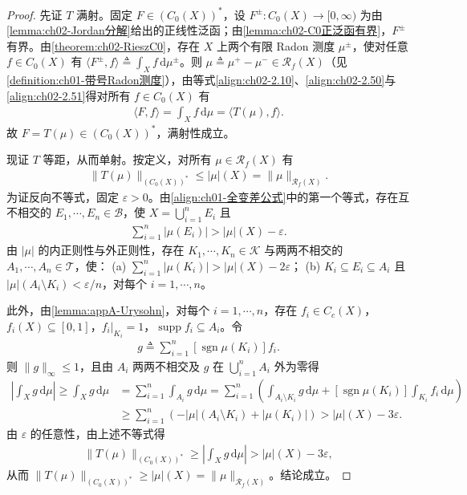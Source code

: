 \documentclass[../../main.tex]{subfiles}%
\begin{document}
\begin{proof}
先证 $T$ 满射。固定 $F\in(C_0(X))^*$，设 $F^\pm:C_0(X)\to[0,\infty)$ 为由\cref{lemma:ch02-Jordan分解}给出的正线性泛函；由\cref{lemma:ch02-C0正泛函有界}，$F^\pm$ 有界。由\cref{theorem:ch02-RieszC0}，存在 $X$ 上两个有限 Radon 测度 $\mu^\pm$，使对任意 $f\in C_0(X)$ 有 $\langle F^\pm,f\rangle\triangleq \int_X f\,\mathrm{d}\mu^\pm$。则 $\mu\triangleq \mu^+-\mu^-\in\mathscr R_f(X)$（见\cref{definition:ch01-带号Radon测度}），由等式\eqref{align:ch02-2.10}、\eqref{align:ch02-2.50}与\eqref{align:ch02-2.51}得对所有 $f\in C_0(X)$ 有
\begin{align*}
\langle F,f\rangle=\int_X f\,\mathrm{d}\mu=\langle T(\mu),f\rangle.
\end{align*}
故 $F=T(\mu)\in(C_0(X))^*$，满射性成立。

现证 $T$ 等距，从而单射。按定义，对所有 $\mu\in\mathscr R_f(X)$ 有
\begin{align*}
\|T(\mu)\|_{(C_0(X))^*}\leqslant|\mu|(X)=\|\mu\|_{\mathscr R_f(X)}.
\end{align*}
为证反向不等式，固定 $\varepsilon>0$。由\eqref{align:ch01-全变差公式}中的第一个等式，存在互不相交的 $E_1,\cdots ,E_n\in\mathscr B$，使 $X=\bigcup_{i=1}^nE_i$ 且
\begin{align*}
\sum_{i=1}^n|\mu(E_i)|>|\mu|(X)-\varepsilon.
\end{align*}
由 $|\mu|$ 的内正则性与外正则性，存在 $K_1,\cdots ,K_n\in\mathscr K$ 与两两不相交的 $A_1,\cdots ,A_n\in\mathscr T$，使：
(a) $\sum_{i=1}^n|\mu(K_i)|>|\mu|(X)-2\varepsilon$；
(b) $K_i\subseteq E_i\subseteq A_i$ 且 $|\mu|(A_i\setminus K_i)<\varepsilon/n$，对每个 $i=1,\cdots ,n$。

此外，由\cref{lemma:appA-Urysohn}，对每个 $i=1,\cdots ,n$，存在 $f_i\in C_c(X)$，$f_i(X)\subseteq[0,1]$，$f_i|_{K_i}=1$，$\operatorname{supp}f_i\subseteq A_i$。令
\begin{align*}
g\triangleq \sum_{i=1}^n[\operatorname{sgn}\mu(K_i)]f_i.
\end{align*}
则 $\|g\|_\infty\leqslant1$，且由 $A_i$ 两两不相交及 $g$ 在 $\bigcup_{i=1}^nA_i$ 外为零得
\begin{align*}
\left|\int_X g\,\mathrm{d}\mu\right|\geqslant\int_X g\,\mathrm{d}\mu
&=\sum_{i=1}^n\int_{A_i}g\,\mathrm{d}\mu
=\sum_{i=1}^n\left(\int_{A_i\setminus K_i}g\,\mathrm{d}\mu+[\operatorname{sgn}\mu(K_i)]\int_{K_i}f_i\,\mathrm{d}\mu\right)\\
&\geqslant\sum_{i=1}^n\left(-|\mu|(A_i\setminus K_i)+|\mu(K_i)|\right)>|\mu|(X)-3\varepsilon.
\end{align*}
由 $\varepsilon$ 的任意性，由上述不等式得
\begin{align*}
\|T(\mu)\|_{(C_0(X))^*}\geqslant\left|\int_X g\,\mathrm{d}\mu\right|>|\mu|(X)-3\varepsilon,
\end{align*}
从而 $\|T(\mu)\|_{(C_0(X))^*}\geqslant|\mu|(X)=\|\mu\|_{\mathscr R_f(X)}$。结论成立。
\end{proof}
\end{document}
